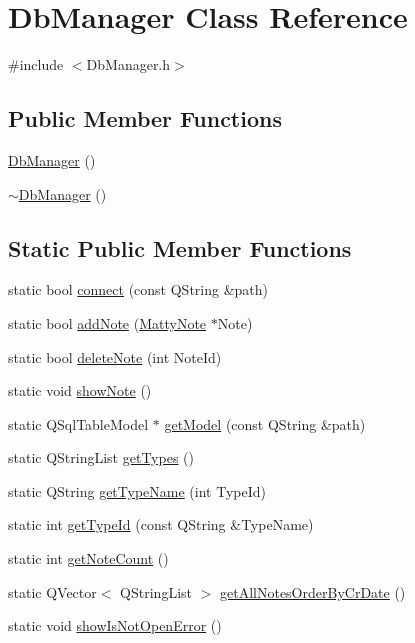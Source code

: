 \hypertarget{classDbManager}{}\section{Db\+Manager Class Reference}
\label{classDbManager}


{\ttfamily \#include $<$Db\+Manager.\+h$>$}

\subsection*{Public Member Functions}
\begin{DoxyCompactItemize}
\item 
\hyperlink{classDbManager_a0d16cf5bba931362e6c581eb1b5ba66a}{Db\+Manager} ()
\item 
\hyperlink{classDbManager_ac5cdf8e5e932d1681ab807d8f256374c}{$\sim$\+Db\+Manager} ()
\end{DoxyCompactItemize}
\subsection*{Static Public Member Functions}
\begin{DoxyCompactItemize}
\item 
static bool \hyperlink{classDbManager_abc90b3bf97dda268b4160a0662305898}{connect} (const Q\+String \&path)
\item 
static bool \hyperlink{classDbManager_a0d97afdec08f212ec39100d26d8b4273}{add\+Note} (\hyperlink{classMattyNote}{Matty\+Note} $\ast$Note)
\item 
static bool \hyperlink{classDbManager_a164849758fd05445c7af2cc04fc3569f}{delete\+Note} (int Note\+Id)
\item 
static void \hyperlink{classDbManager_a96908aac2c76d86fb1861ac8f755b962}{show\+Note} ()
\item 
static Q\+Sql\+Table\+Model $\ast$ \hyperlink{classDbManager_ac4e759380194e624382e267432de5357}{get\+Model} (const Q\+String \&path)
\item 
static Q\+String\+List \hyperlink{classDbManager_ade7585873652935bb12cb1ad546ceba2}{get\+Types} ()
\item 
static Q\+String \hyperlink{classDbManager_a6cb58e12049873e8b1b4b6ecd74dbfb6}{get\+Type\+Name} (int Type\+Id)
\item 
static int \hyperlink{classDbManager_a92ebefd0d5fae643db1fc51cc7ea0c31}{get\+Type\+Id} (const Q\+String \&Type\+Name)
\item 
static int \hyperlink{classDbManager_ae3998b50545d88a27d4361053f39b050}{get\+Note\+Count} ()
\item 
static Q\+Vector$<$ Q\+String\+List $>$ \hyperlink{classDbManager_a9b35a902ca6a35cd2589a3d1fffda94b}{get\+All\+Notes\+Order\+By\+Cr\+Date} ()
\item 
static void \hyperlink{classDbManager_a2d60ab2a556cf0276bf306c7545ed03d}{show\+Is\+Not\+Open\+Error} ()
\end{DoxyCompactItemize}
